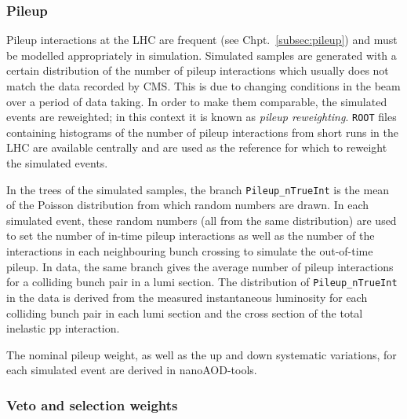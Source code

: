 

\subsubsection{Pileup}
\label{subsubsec:pu_reweighting}

Pileup interactions at the LHC are frequent (see Chpt.~\ref{subsec:pileup}) and must be modelled appropriately in simulation. Simulated samples are generated with a certain distribution of the number of pileup interactions which usually does not match the data recorded by CMS. This is due to changing conditions in the beam over a period of data taking. In order to make them comparable, the simulated events are reweighted; in this context it is known as \emph{pileup reweighting}. \texttt{ROOT} files containing histograms of the number of pileup interactions from short runs in the LHC are available centrally and are used as the reference for which to reweight the simulated events.

In the trees of the simulated samples, the branch \texttt{Pileup\_nTrueInt} is the mean of the Poisson distribution from which random numbers are drawn. In each simulated event, these random numbers (all from the same distribution) are used to set the number of in-time pileup interactions as well as the number of the interactions in each neighbouring bunch crossing to simulate the out-of-time pileup. In data, the same branch gives the average number of pileup interactions for a colliding bunch pair in a lumi section. The distribution of \texttt{Pileup\_nTrueInt} in the data is derived from the measured instantaneous luminosity for each colliding bunch pair in each lumi section and the cross section of the total inelastic pp interaction.

The nominal pileup weight, as well as the up and down systematic variations, for each simulated event are derived in nanoAOD-tools. %




\subsubsection{Veto and selection weights}
\label{subsubsec:veto_sel_weights}

